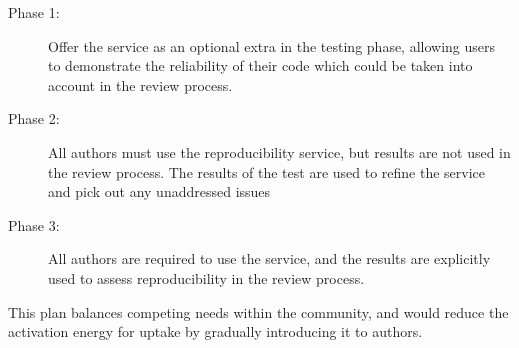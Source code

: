 \documentclass{llncs}
\begin{document}
\begin{description}
\item[Phase 1:] Offer the service as an optional extra in the testing phase, allowing users to demonstrate 
the reliability of their code which could be taken into account in the review process.
\item[Phase 2:] All authors must use the reproducibility service, but results are not used in the review
process. The results of the test are used to refine the service and pick out any unaddressed issues
\item[Phase 3:] All authors are required to use the service, and the results are explicitly used to 
assess reproducibility in the review process.
\end{description}

This plan balances competing needs within the community, and would reduce the activation
energy for uptake by gradually introducing it to authors.



\end{document}
